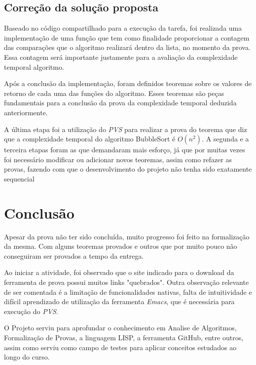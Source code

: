 \documentclass[12pt]{article}
\begin{document}
\subsection{Correção da solução proposta}
Baseado no código compartilhado para a execução da tarefa, foi realizada uma implementação de uma função que tem como finalidade proporcionar a contagem das comparações que o algoritmo realizará dentro da lista, no momento da prova. Essa contagem será importante justamente para a avaliação da complexidade temporal algoritmo.

Após a conclusão da implementação, foram definidos teoremas sobre os valores de retorno de cada uma das funções do algoritmo. Esses teoremas são peças fundamentais para a conclusão da prova da complexidade temporal deduzida anteriormente.

A última etapa foi a utilização do \emph{PVS} para realizar a prova do teorema que diz que a complexidade temporal do algoritmo BubbleSort é $O(n^2)$. A segunda e a terceira etapas foram as que demandaram mais esforço, já que por muitas vezes foi necessário modificar ou adicionar novos teoremas, assim como refazer as provas, fazendo com que o desenvolvimento do projeto não tenha sido exatamente sequencial

\section{Conclusão}
Apesar da prova não ter sido concluída, muito progresso foi feito na formalização da mesma. Com alguns teoremas provados e outros que por muito pouco não conseguiram ser provados a tempo da entrega.

Ao iniciar a atividade, foi observado que o site indicado para o download da ferramenta de prova possui muitos links "quebrados". Outra observação relevante de ser comentada é a limitação de funcionalidades nativas, falta de intuitividade e difícil aprendizado de utilização da ferramenta \emph{Emacs}, que é necessária para execução do \emph{PVS}.

O Projeto serviu para aprofundar o conhecimento em Analise de Algoritmos, Formalização de Provas, a linguagem LISP, a ferramenta GitHub, entre outros, assim como serviu como campo de testes para aplicar conceitos estudados ao longo do curso.
\end{document}
